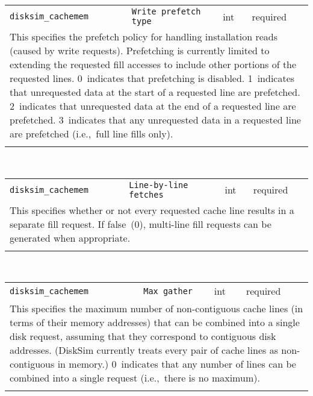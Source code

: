 \noindent 
\begin{tabular}{|p{\lpmodwidth}|p{\lpnamewidth}|p{0.5in}|p{0.5in}|}
\cline{1-4}
\texttt{disksim\_cachemem} & \texttt{Write prefetch type} & int & required \\ 
\cline{1-4}
\multicolumn{4}{|p{6in}|}{
This specifies the prefetch policy for handling installation reads (caused
by write requests). Prefetching is currently limited to extending the
requested fill accesses to include other portions of the requested
lines.
0~indicates that prefetching is disabled.
1~indicates that unrequested data at the start of a requested line are
prefetched.
2~indicates that unrequested data at the end of a requested line are
prefetched.
3~indicates that any unrequested data in a requested line are
prefetched (i.e.,~full line fills only).
}\\ 
\cline{1-4}
\multicolumn{4}{p{5in}}{}\\
\end{tabular}\\ 
\noindent 
\begin{tabular}{|p{\lpmodwidth}|p{\lpnamewidth}|p{0.5in}|p{0.5in}|}
\cline{1-4}
\texttt{disksim\_cachemem} & \texttt{Line-by-line fetches} & int & required \\ 
\cline{1-4}
\multicolumn{4}{|p{6in}|}{
This specifies whether or not every requested cache line results in a
separate fill request. If false~(0), multi-line fill requests can be
generated when appropriate.
}\\ 
\cline{1-4}
\multicolumn{4}{p{5in}}{}\\
\end{tabular}\\ 
\noindent 
\begin{tabular}{|p{\lpmodwidth}|p{\lpnamewidth}|p{0.5in}|p{0.5in}|}
\cline{1-4}
\texttt{disksim\_cachemem} & \texttt{Max gather} & int & required \\ 
\cline{1-4}
\multicolumn{4}{|p{6in}|}{
This specifies the maximum number of non-contiguous cache lines (in terms
of their memory addresses)
that can be combined into a single disk request, assuming that they
correspond to contiguous disk addresses. (DiskSim currently treats
every pair of cache lines as non-contiguous in memory.)
0~indicates that any number of lines can be combined into a single
request (i.e.,~there is no maximum).
}\\ 
\cline{1-4}
\multicolumn{4}{p{5in}}{}\\
\end{tabular}\\ 
